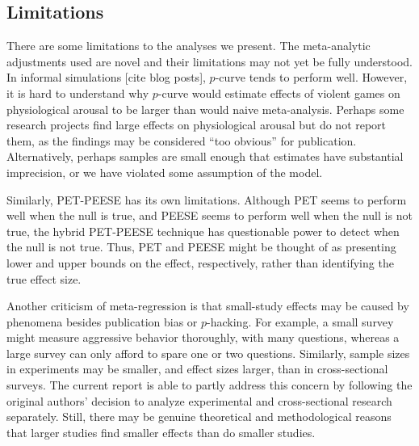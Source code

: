 \documentclass[man]{apa6}
\begin{document}
\subsection{Limitations}
There are some limitations to the analyses we present. The meta-analytic adjustments used are novel and their limitations may not yet be fully understood. In informal simulations [cite blog posts], $p$-curve tends to perform well. However, it is hard to understand why $p$-curve would estimate effects of violent games on physiological arousal to be larger than would naive meta-analysis. Perhaps some research projects find large effects on physiological arousal but do not report them, as the findings may be considered ``too obvious'' for publication. Alternatively, perhaps samples are small enough that estimates have substantial imprecision, or we have violated some assumption of the model.

Similarly, PET-PEESE has its own limitations. Although PET seems to perform well when the null is true, and PEESE seems to perform well when the null is not true, the hybrid PET-PEESE technique has questionable power to detect when the null is not true. Thus, PET and PEESE might be thought of as presenting lower and upper bounds on the effect, respectively, rather than identifying the true effect size. 

Another criticism of meta-regression is that small-study effects may be caused by phenomena besides publication bias or $p$-hacking. For example, a small survey might measure aggressive behavior thoroughly, with many questions, whereas a large survey can only afford to spare one or two questions. Similarly, sample sizes in experiments may be smaller, and effect sizes larger, than in cross-sectional surveys. The current report is able to partly address this concern by following the original authors' decision to analyze experimental and cross-sectional research separately. Still, there may be genuine theoretical and methodological reasons that larger studies find smaller effects than do smaller studies. %

\end{document}
